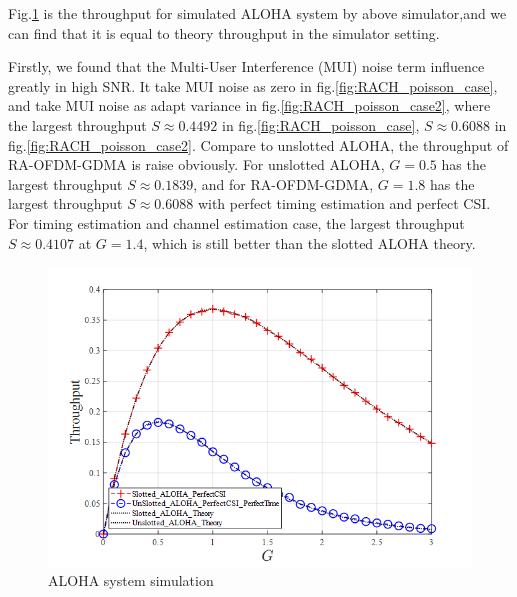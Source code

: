 Fig.\ref{fig:ALOHA_system_simulation} is the throughput for simulated ALOHA system by above simulator,and we can find that it is equal to theory throughput in the simulator setting.



Firstly, we found that the Multi-User Interference (MUI) noise term influence greatly in high SNR. It take MUI noise as zero in fig.\ref{fig:RACH_poisson_case}, and take MUI noise as adapt variance in fig.\ref{fig:RACH_poisson_case2}, where the largest throughput $S \approx 0.4492 $ in fig.\ref{fig:RACH_poisson_case}, $S \approx 0.6088$ in fig.\ref{fig:RACH_poisson_case2}. Compare to unslotted ALOHA, the throughput of RA-OFDM-GDMA is raise obviously. For unslotted ALOHA, $G = 0.5$ has the largest throughput $S \approx 0.1839 $, and for RA-OFDM-GDMA, $G = 1.8$ has the largest throughput $S \approx 0.6088$ with perfect timing estimation and perfect CSI.
For timing estimation and channel estimation case, the largest throughput $S \approx 0.4107$ at $G=1.4$, which is still better than the slotted ALOHA theory.





\begin{figure}[t!]
 \centering
 \includegraphics[width=15cm]{fig/RACH_ALOHA_throughput_simulation.png}
 \caption{ALOHA system simulation}
 \label{fig:ALOHA_system_simulation}
\end{figure}


